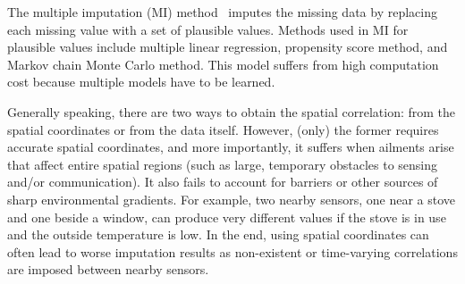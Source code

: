 The multiple imputation (MI) method~\cite{yuan2000multiple} imputes the missing data by replacing each missing value with a set of plausible values.
Methods used in MI for plausible values include multiple linear regression, propensity score method, and 
Markov chain Monte Carlo method.
This model suffers from high computation cost because multiple models have to be learned. 

Generally speaking, there are two ways to obtain the spatial
correlation: from the spatial coordinates or from the data itself.
However, (only) the former requires accurate spatial coordinates, and
more importantly, it suffers when ailments arise that affect entire
spatial regions (such as large, temporary obstacles to sensing and/or
communication).  It also fails to account for barriers or other
sources of sharp environmental gradients.  For example, two nearby
sensors, one near a stove and one beside a window, can produce very
different values if the stove is in use and the outside temperature is
low.  In the end, using spatial coordinates can often lead to worse
imputation results as non-existent or time-varying correlations are
imposed between nearby sensors.


